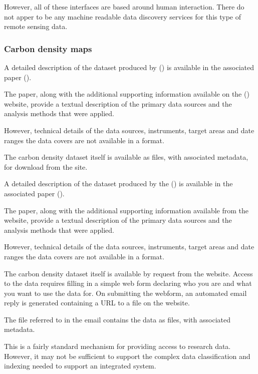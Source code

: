 \documentclass{article}
\begin{document}
However, all of these interfaces are based around human interaction. There
do not apper to be any machine readable data discovery services for this type of remote sensing data.

\subsubsection{Carbon density maps}

A detailed description of the dataset produced by 
(\cite{nasa-jpl-carbon}) is available in the associated paper
(\cite{saatchi-2011}).

The paper, along with the additional supporting information available
on the  (\cite{pnas}) website,
provide a textual description
of the primary data sources
and the analysis methods that were applied.

However, technical details of the data sources, instruments, target areas
and date ranges the data covers are not available in a
\cite{machine-readable}
format.

The carbon density dataset itself is available as \cite{format-geotiff}
files, with associated \cite{format-world} metadata, for download from the
\cite{nasa-jpl-carbon-ftp} site.


A detailed description of the dataset produced by the 
(\cite{whrc}) is available in the associated paper (\cite{baccini-2012}).

The paper, along with the additional supporting information available from
the \cite{journal-nature} website,
provide a textual description
of the primary data sources
and the analysis methods that were applied.

However, technical details of the data sources, instruments, target areas
and date ranges the data covers are not available in a
\cite{machine-readable}
format.

The carbon density dataset itself is available by request from the
\cite{whrc-data} website. Access to the data requires filling in a simple
web form declaring who you are and what you want to use the data for. On
submitting the webform, an automated email reply is generated containing
a URL to a \cite{format-zip} file on the \cite{whrc} website.

The \cite{format-zip} file referred to in the email contains the data as
\cite{format-geotiff} files, with associated \cite{format-world} metadata.

This is a fairly standard mechanism for providing access to research
data. However, it may not be sufficient to support the complex data
classification and indexing needed to support an integrated
\cite{vo} system.
\end{document}
